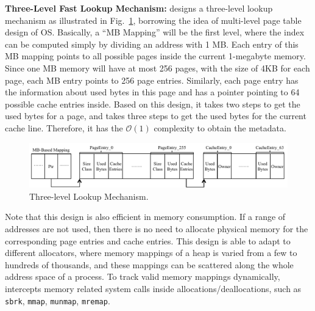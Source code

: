 
\textbf{Three-Level Fast Lookup Mechanism:} \MP{} designs a three-level lookup mechanism as illustrated in Fig.~\ref{fig:lookup}, borrowing the idea of multi-level page table design of OS. Basically, a ``MB Mapping'' will be the first level, where the index can be computed simply by dividing an address with 1 MB. Each entry of this MB mapping points to all possible pages inside the current 1-megabyte memory. Since one MB memory will have at most 256 pages, with the size of 4KB for each page, each MB entry points to 256 page entries. Similarly, each page entry has the information about used bytes in this page and has a pointer pointing to 64 possible cache entries inside. Based on this design, it takes two steps to get the used bytes for a page, and takes three steps to get the used bytes for the current cache line. Therefore, it has the $\mathcal{O}(1)$ 
complexity to obtain the metadata.  
          
\begin{figure}[!ht]
\centering
\includegraphics[width=5.5in]{figures/lookup2}
\caption{Three-level Lookup Mechanism.\label{fig:lookup}}
\end{figure}

Note that this design is also efficient in memory consumption. If a range of addresses are not used, then there is no need to allocate physical memory for the corresponding page entries and cache entries. This design is able to adapt to different allocators, where memory mappings of a heap is varied from a few to hundreds of thousands, and these mappings can be scattered along the whole address space of a process. To track valid memory mappings dynamically, \MP{} intercepts memory related system calls inside allocations/deallocations, such as \texttt{sbrk}, \texttt{mmap}, \texttt{munmap}, \texttt{mremap}. 